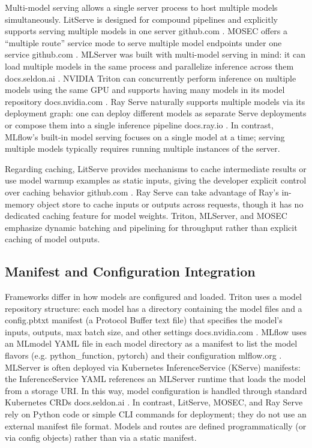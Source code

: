 Multi-model serving allows a single server process to host multiple models simultaneously. LitServe is designed for compound pipelines and explicitly supports serving multiple models in one server
github.com
\cite{litserve}. MOSEC offers a “multiple route” service mode to serve multiple model endpoints under one service 
github.com
\cite{mosec}. MLServer was built with multi-model serving in mind: it can load multiple models in the same process and parallelize inference across them
docs.seldon.ai
\cite{mlserver}. NVIDIA Triton can concurrently perform inference on multiple models using the same GPU and supports having many models in its model repository
docs.nvidia.com
\cite{triton}. Ray Serve naturally supports multiple models via its deployment graph: one can deploy different models as separate Serve deployments or compose them into a single inference pipeline
docs.ray.io
\cite{ray}. In contrast, MLflow’s built-in model serving focuses on a single model at a time; serving multiple models typically requires running multiple instances of the server.

Regarding caching, LitServe provides mechanisms to cache intermediate results or use model warmup examples as static inputs, giving the developer explicit control over caching behavior
github.com
\cite{litserve}. Ray Serve can take advantage of Ray’s in-memory object store to cache inputs or outputs across requests, though it has no dedicated caching feature for model weights. Triton, MLServer, and MOSEC emphasize dynamic batching and pipelining for throughput rather than explicit caching of model outputs.

\subsection{Manifest and Configuration Integration}

Frameworks differ in how models are configured and loaded. Triton uses a model repository structure: each model has a directory containing the model files and a config.pbtxt manifest (a Protocol Buffer text file) that specifies the model’s inputs, outputs, max batch size, and other settings
docs.nvidia.com
\cite{triton}. MLflow uses an MLmodel YAML file in each model directory as a manifest to list the model flavors (e.g. python_function, pytorch) and their configuration
mlflow.org
\cite{mlflow}. MLServer is often deployed via Kubernetes InferenceService (KServe) manifests: the InferenceService YAML references an MLServer runtime that loads the model from a storage URI. In this way, model configuration is handled through standard Kubernetes CRDs
docs.seldon.ai
\cite{mlserver}. In contrast, LitServe, MOSEC, and Ray Serve rely on Python code or simple CLI commands for deployment; they do not use an external manifest file format. Models and routes are defined programmatically (or via config objects) rather than via a static manifest.

